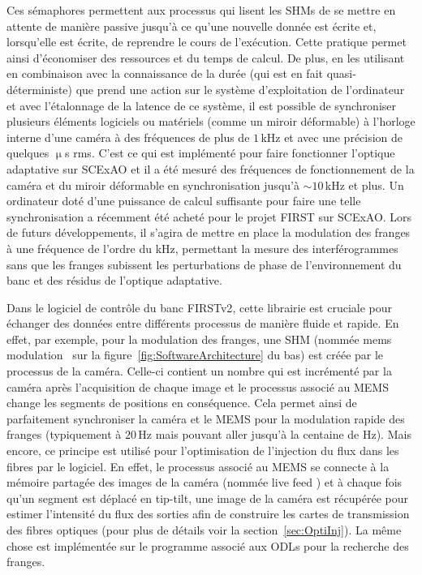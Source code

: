 Ces sémaphores permettent aux processus qui lisent les \ac{SHM}s de se mettre en attente de manière passive jusqu'à ce qu'une nouvelle donnée est écrite et, lorsqu'elle est écrite, de reprendre le cours de l'exécution. Cette pratique permet ainsi d'économiser des ressources et du temps de calcul. De plus, en les utilisant en combinaison avec la connaissance de la durée (qui est en fait quasi-déterministe) que prend une action sur le système d'exploitation de l'ordinateur et avec l'étalonnage de la latence de ce système, il est possible de synchroniser plusieurs éléments logiciels ou matériels (comme un miroir déformable) à l'horloge interne d'une caméra à des fréquences de plus de $1 \,$kHz et avec une précision de quelques $\upmu$s rms. C'est ce qui est implémenté pour faire fonctionner l'optique adaptative sur \ac{SCExAO} et il a été mesuré des fréquences de fonctionnement de la caméra et du miroir déformable en synchronisation jusqu'à $\sim 10 \,$kHz et plus. Un ordinateur doté d'une puissance de calcul suffisante pour faire une telle synchronisation a récemment été acheté pour le projet \ac{FIRST} sur \ac{SCExAO}. Lors de futurs développements, il s'agira de mettre en place la modulation des franges à une fréquence de l'ordre du kHz, permettant la mesure des interférogrammes sans que les franges subissent les perturbations de phase de l'environnement du banc et des résidus de l'optique adaptative.

Dans le logiciel de contrôle du banc \ac{FIRSTv2}, cette librairie est cruciale pour échanger des données entre différents processus de manière fluide et rapide. En effet, par exemple, pour la modulation des franges, une \ac{SHM} (nommée \og mems modulation \fg~sur la figure~\ref{fig:SoftwareArchitecture} du bas) est créée par le processus de la caméra. Celle-ci contient un nombre qui est incrémenté par la caméra après l'acquisition de chaque image et le processus associé au \ac{MEMS} change les segments de positions en conséquence. Cela permet ainsi de parfaitement synchroniser la caméra et le \ac{MEMS} pour la modulation rapide des franges (typiquement à $20 \,$Hz mais pouvant aller jusqu'à la centaine de Hz). Mais encore, ce principe est utilisé pour l'optimisation de l'injection du flux dans les fibres par le logiciel. En effet, le processus associé au \ac{MEMS} se connecte à la mémoire partagée des images de la caméra (nommée \og live feed \fg) et à chaque fois qu'un segment est déplacé en tip-tilt, une image de la caméra est récupérée pour estimer l'intensité du flux des sorties afin de construire les cartes de transmission des fibres optiques (pour plus de détails voir la section~\ref{sec:OptiInj}). La même chose est implémentée sur le programme associé aux \ac{ODL}s pour la recherche des franges.

